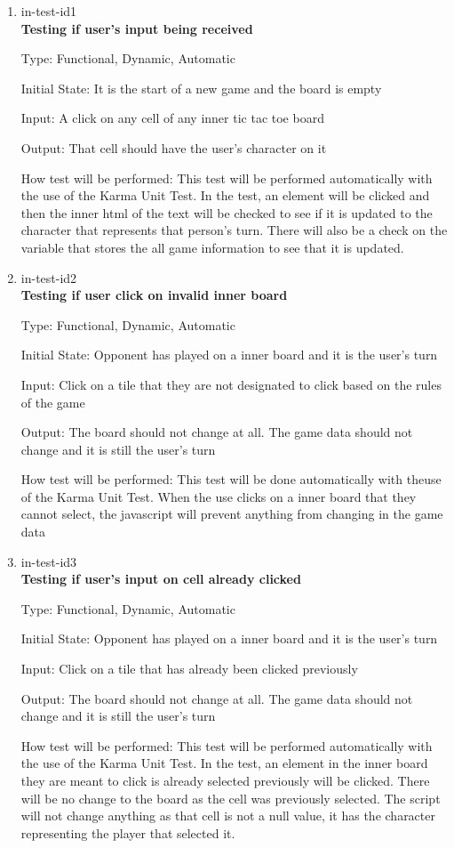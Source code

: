 \documentclass[12pt, titlepage]{article}
\begin{document}
\begin{enumerate}

\item{in-test-id1\\}
\textbf {Testing if user's input being received}

Type: Functional, Dynamic, Automatic
					
Initial State: It is the start of a new game and the board is empty
					
Input: A click on any cell of any inner tic tac toe board
					
Output: That cell should have the user's character on it
					
How test will be performed: This test will be performed automatically with the use of the Karma Unit Test. In the test, an element will be clicked and then the inner html of the text will be checked to see if it is updated to the character that represents that person's turn. There will also be a check on the variable that stores the all game information to see that it is updated.
					
\item{in-test-id2\\}
\textbf{Testing if user click on invalid inner board}

Type: Functional, Dynamic, Automatic
					
Initial State: Opponent has played on a inner board and it is the user's turn

Input: Click on a tile that they are not designated to click based on the rules of the game
					
Output: The board should not change at all. The game data should not change and it is still the user's turn
					
How test will be performed: This test will be done automatically with theuse of the Karma Unit Test. When the use clicks on a inner board that they cannot select, the javascript will prevent anything from changing in the game data

\item{in-test-id3\\}
\textbf{Testing if user's input on cell already clicked}

Type: Functional, Dynamic, Automatic
					
Initial State: Opponent has played on a inner board and it is the user's turn
					
Input: Click on a tile that has already been clicked previously
					
Output: The board should not change at all. The game data should not change and it is still the user's turn
					
How test will be performed: This test will be performed automatically with the use of the Karma Unit Test. In the test, an element in the inner board they are meant to click is already selected previously will be clicked. There will be no change to the board as the cell was previously selected. The script will not change anything as that cell is not a null value, it has the character representing the player that selected it.

\end{enumerate}
\end{document}
